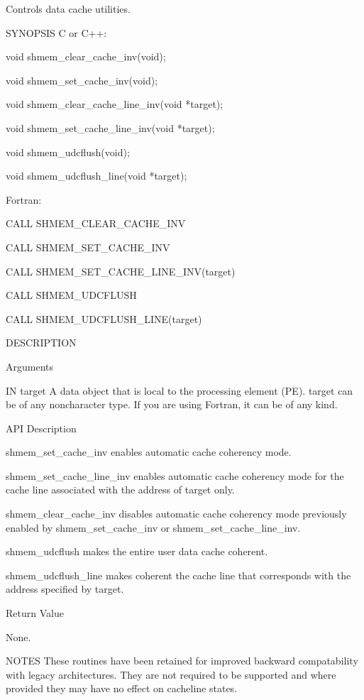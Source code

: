        Controls data cache utilities.

SYNOPSIS
       C or C++:

	  void shmem_clear_cache_inv(void);

	  void shmem_set_cache_inv(void);

	  void shmem_clear_cache_line_inv(void *target);

	  void shmem_set_cache_line_inv(void *target);

	  void shmem_udcflush(void);

	  void shmem_udcflush_line(void *target);

       Fortran:

	  CALL SHMEM_CLEAR_CACHE_INV

	  CALL SHMEM_SET_CACHE_INV

	  CALL SHMEM_SET_CACHE_LINE_INV(target)

	  CALL SHMEM_UDCFLUSH

	  CALL SHMEM_UDCFLUSH_LINE(target)

DESCRIPTION

Arguments

	IN       target	 A  data  object that is local to the processing element (PE).
		 target can be of any noncharacter type.   If  you  are	 using
		 Fortran, it can be of any kind.

API Description

       shmem_set_cache_inv enables automatic cache coherency mode.

       shmem_set_cache_line_inv enables automatic cache coherency mode for the
       cache line associated with the address of target only.

       shmem_clear_cache_inv   disables	  automatic   cache   coherency	  mode
       previously  enabled by shmem_set_cache_inv or shmem_set_cache_line_inv.

       shmem_udcflush makes the entire user data cache coherent.

       shmem_udcflush_line makes coherent the cache line that corresponds with
       the address specified by target.

Return Value

	None.

NOTES
       These  routines	have been retained for improved backward compatability
       with legacy architectures.  They are not	 required to be supported and where 
       provided they may have no effect on cacheline states.


